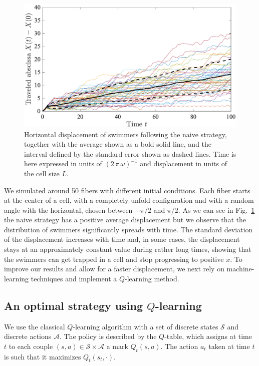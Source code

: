 \documentclass[aps,pre,reprint,superscriptaddress]{revtex4-2}
\begin{document}
\begin{figure}[ht]
  \centerline{\includegraphics[width=\columnwidth]{travel_naive_diffreal}}
  \caption{\label{fig:travel_naive_diffreal} Horizontal displacement of swimmers following the naive strategy, together with the average shown as a bold solid line, and the interval defined by the standard error shown as dashed lines. Time is here expressed in units of $(2\,\pi\,\omega)^{-1}$ and displacement in units of the cell size $L$.}
\end{figure}
We simulated around 50 fibers with different initial conditions. Each fiber starts at the center of a cell, with a completely unfold configuration and with a random angle with the horizontal, chosen between $-{\pi}/{2}$ and ${\pi}/{2}$. As we can see in Fig.~\ref{fig:travel_naive_diffreal} the naive strategy has a positive average displacement but we observe that the distribution of swimmers significantly spreads with time. The standard deviation of the displacement increases with time and, in some cases, the displacement stays at an approximately constant value during rather long times, showing that the swimmers can get trapped in a cell and stop progressing to positive $x$.  To improve our results and allow for a faster displacement, we next rely on machine-learning techniques and implement a $Q$-learning method.


\subsection{An optimal strategy using $Q$-learning}
We use the classical $Q$-learning algorithm with a set of discrete states $\mathcal{S}$ and discrete actions $\mathcal{A}$. The policy is described by the $Q$-table, which assigns at time $t$ to each couple $(s,a)\in \mathcal{S}\times \mathcal{A}$ a mark $Q_t(s,a)$. The action $a_t$ taken at time $t$ is such that it maximizes $Q_t(s_t,\cdot)$.
\end{document}
